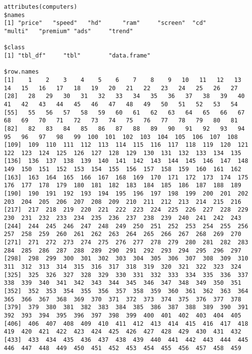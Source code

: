 \begin{lstlisting}
attributes(computers)
$names
[1] "price"   "speed"   "hd"      "ram"     "screen"  "cd"      "multi"   "premium" "ads"     "trend"  

$class
[1] "tbl_df"     "tbl"        "data.frame"

$row.names
[1]    1    2    3    4    5    6    7    8    9   10   11   12   13   14   15   16   17   18   19   20   21   22   23   24   25   26   27
[28]   28   29   30   31   32   33   34   35   36   37   38   39   40   41   42   43   44   45   46   47   48   49   50   51   52   53   54
[55]   55   56   57   58   59   60   61   62   63   64   65   66   67   68   69   70   71   72   73   74   75   76   77   78   79   80   81
[82]   82   83   84   85   86   87   88   89   90   91   92   93   94   95   96   97   98   99  100  101  102  103  104  105  106  107  108
[109]  109  110  111  112  113  114  115  116  117  118  119  120  121  122  123  124  125  126  127  128  129  130  131  132  133  134  135
[136]  136  137  138  139  140  141  142  143  144  145  146  147  148  149  150  151  152  153  154  155  156  157  158  159  160  161  162
[163]  163  164  165  166  167  168  169  170  171  172  173  174  175  176  177  178  179  180  181  182  183  184  185  186  187  188  189
[190]  190  191  192  193  194  195  196  197  198  199  200  201  202  203  204  205  206  207  208  209  210  211  212  213  214  215  216
[217]  217  218  219  220  221  222  223  224  225  226  227  228  229  230  231  232  233  234  235  236  237  238  239  240  241  242  243
[244]  244  245  246  247  248  249  250  251  252  253  254  255  256  257  258  259  260  261  262  263  264  265  266  267  268  269  270
[271]  271  272  273  274  275  276  277  278  279  280  281  282  283  284  285  286  287  288  289  290  291  292  293  294  295  296  297
[298]  298  299  300  301  302  303  304  305  306  307  308  309  310  311  312  313  314  315  316  317  318  319  320  321  322  323  324
[325]  325  326  327  328  329  330  331  332  333  334  335  336  337  338  339  340  341  342  343  344  345  346  347  348  349  350  351
[352]  352  353  354  355  356  357  358  359  360  361  362  363  364  365  366  367  368  369  370  371  372  373  374  375  376  377  378
[379]  379  380  381  382  383  384  385  386  387  388  389  390  391  392  393  394  395  396  397  398  399  400  401  402  403  404  405
[406]  406  407  408  409  410  411  412  413  414  415  416  417  418  419  420  421  422  423  424  425  426  427  428  429  430  431  432
[433]  433  434  435  436  437  438  439  440  441  442  443  444  445  446  447  448  449  450  451  452  453  454  455  456  457  458  459

\end{lstlisting}
